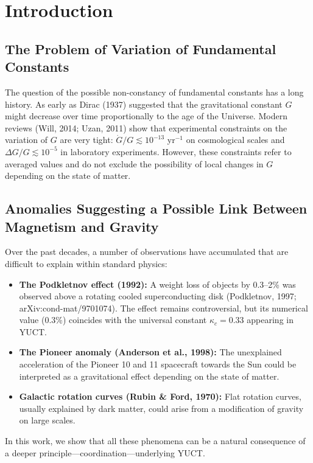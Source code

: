 \documentclass[12pt]{article}
\theoremstyle{remark}
\newcommand{\kappac}{\kappa_c}
\begin{document}
	\tableofcontents
	\newpage
	
	\section{Introduction}
	\label{sec:intro}
	
	\subsection{The Problem of Variation of Fundamental Constants}
	\label{subsec:constants-variation}
	
	The question of the possible non-constancy of fundamental constants has a long history. As early as Dirac (1937) suggested that the gravitational constant $G$ might decrease over time proportionally to the age of the Universe. Modern reviews (Will, 2014; Uzan, 2011) show that experimental constraints on the variation of $G$ are very tight: $\dot{G}/G \lesssim 10^{-13}$ yr$^{-1}$ on cosmological scales and $\Delta G/G \lesssim 10^{-5}$ in laboratory experiments. However, these constraints refer to averaged values and do not exclude the possibility of local changes in $G$ depending on the state of matter.
	
	\subsection{Anomalies Suggesting a Possible Link Between Magnetism and Gravity}
	\label{subsec:anomalies}
	
	Over the past decades, a number of observations have accumulated that are difficult to explain within standard physics:
	\begin{itemize}
		\item \textbf{The Podkletnov effect (1992):} A weight loss of objects by 0.3–2\% was observed above a rotating cooled superconducting disk (Podkletnov, 1997; arXiv:cond-mat/9701074). The effect remains controversial, but its numerical value (0.3\%) coincides with the universal constant $\kappac = 0.33$ appearing in YUCT.
		\item \textbf{The Pioneer anomaly (Anderson et al., 1998):} The unexplained acceleration of the Pioneer 10 and 11 spacecraft towards the Sun could be interpreted as a gravitational effect depending on the state of matter.
		\item \textbf{Galactic rotation curves (Rubin \& Ford, 1970):} Flat rotation curves, usually explained by dark matter, could arise from a modification of gravity on large scales.
	\end{itemize}
	In this work, we show that all these phenomena can be a natural consequence of a deeper principle—coordination—underlying YUCT.
	
\end{document}

